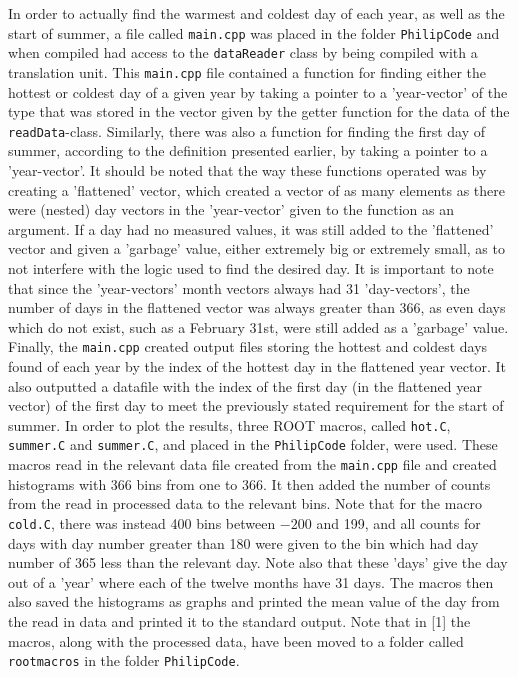 \documentclass[a4, 12pt]{article}
\begin{document}
\indent In order to actually find the warmest and coldest day of each year, as well as the start of summer, a file called \texttt{main.cpp} was placed in the folder \texttt{PhilipCode} and when compiled had access to the \texttt{dataReader} class by being compiled with a translation unit. This \texttt{main.cpp} file contained a function for finding either the hottest or coldest day of a given year by taking a pointer to a 'year-vector' of the type that was stored in the vector given by the getter function for the data of the \texttt{readData}-class. Similarly, there was also a function for finding the first day of summer, according to the definition presented earlier, by taking a pointer to a 'year-vector'. It should be noted that the way these functions operated was by creating a 'flattened' vector, which created a vector of as many elements as there were (nested) day vectors in the 'year-vector' given to the function as an argument. If a day had no measured values, it was still added to the 'flattened' vector and given a 'garbage' value, either extremely big or extremely small, as to not interfere with the logic used to find the desired day. It is important to note that since the 'year-vectors' month vectors always had 31 'day-vectors', the number of days in the flattened vector was always greater than 366, as even days which do not exist, such as a February 31st, were still added as a 'garbage' value. Finally, the \texttt{main.cpp} created output files storing the hottest and coldest days found of each year by the index of the hottest day in the flattened year vector. It also outputted a datafile with the index of the first day (in the flattened year vector) of the first day to meet the previously stated requirement for the start of summer. \newline \indent
In order to plot the results, three ROOT macros, called \texttt{hot.C}, \texttt{summer.C} and \texttt{summer.C}, and placed in the \texttt{PhilipCode} folder, were used. These macros read in the relevant data file created from the \texttt{main.cpp} file and created histograms with 366 bins from one to 366. It then added the number of counts from the read in processed data to the relevant bins. Note that for the macro \texttt{cold.C}, there was instead 400 bins between $-200$ and 199, and all counts for days with day number greater than 180 were given to the bin which had day number of 365 less than the relevant day. Note also that these 'days' give the day out of a 'year' where each of the twelve months have 31 days. The macros then also saved the histograms as graphs and printed the mean value of the day from the read in data and printed it to the standard output. Note that in [1] the macros, along with the processed data, have been moved to a folder called \texttt{rootmacros} in the folder \texttt{PhilipCode}.
\end{document}
